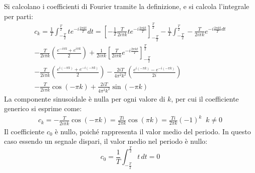 \documentclass{article}
\begin{document}
Si calcolano i coefficienti di Fourier tramite la definizione, e si calcola l'integrale per parti: 
\begin{gather*}
    c_k=\displaystyle\frac{1}{T}\int_{-\frac{T}{2}}^{\frac{T}{2}}te^{-i\frac{2\pi kt}{T}}dt=\displaystyle\left[-\frac{1}{T}\frac{T}{2i\pi k}te^{-i\frac{2\pi kt}{T}}\right]_{-\frac{T}{2}}^{\frac{T}{2}}-
    \frac{1}{T}\int_{-\frac{T}{2}}^{\frac{T}{2}}-\frac{T}{2i\pi k}e^{-i\frac{2\pi kt}{T}dt}\\
    \displaystyle-\frac{T}{2i\pi k}\left(\frac{e^{-i\pi k}+e^{i\pi k}}{2}\right)+\frac{1}{2i\pi k}\left[\frac{T}{2i\pi k}e^{-i\frac{2\pi kt}{T}}\right]_{-\frac{T}{2}}^{\frac{T}{2}}\\
    \displaystyle-\frac{T}{2i\pi k}\left(\frac{e^{i(-\pi k)}+e^{-i(-\pi k)}}{2}\right)-\frac{2iT}{4\pi^2k^2}\left(\frac{e^{i(-\pi k)}-e^{-i(-\pi k)}}{2i}\right)\\
    \displaystyle-\frac{T}{2i\pi k}\cos\left(-\pi k\right)+\frac{2iT}{4\pi^2k^2}\sin(-\pi k)
\end{gather*}
La componente sinusoidale è nulla per ogni valore di $k$, per cui il coefficiente generico si esprime come:
\begin{gather}
    c_k=\displaystyle-\frac{T}{2i\pi k}\cos(-\pi k)=\frac{Ti}{2\pi k}\cos(\pi k)=\frac{Ti}{2\pi k}(-1)^k \;\;k\neq0
\end{gather}
Il coefficiente $c_0$ è nullo, poiché rappresenta il valor medio del periodo. In questo caso essendo un segnale dispari, il valor medio nel periodo è nullo:
\begin{equation}
    c_0=\displaystyle\frac{1}{T}\int_{-\frac{T}{2}}^{\frac{T}{2}}t\,dt=0
\end{equation}
\end{document}
